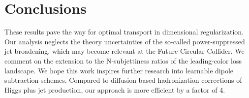 \section{Conclusions}\label{sec:conclusions}

These results pave the way for optimal transport in dimensional
regularization. Our analysis neglects the theory uncertainties of the
so-called power-suppressed jet broadening, which may become relevant at
the Future Circular Collider. We comment on the extension to the
N-subjettiness ratios of the leading-color loss landscape. We hope this
work inspires further research into learnable dipole subtraction
schemes. Compared to diffusion-based hadronization corrections of Higgs
plus jet production, our approach is more efficient by a factor of 4.

